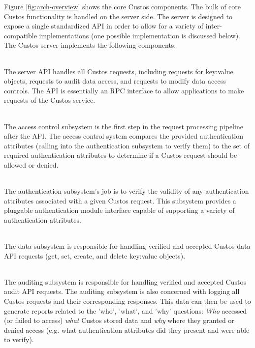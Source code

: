 Figure \ref{fig:arch-overview} shows the core Custos components.  The
bulk of core Custos functionality is handled on the server side. The
server is designed to expose a single standardized API in order to
allow for a variety of inter-compatible implementations (one possible
implementation is discussed below). The Custos server implements the
following components:

\begin{packed_desc}
\item[API] \hfill \\ The server API handles all Custos requests,
  including requests for key:value objects, requests to audit data
  access, and requests to modify data access controls. The API is
  essentially an RPC interface to allow applications to make requests
  of the Custos service.
\item[Access Control Subsystem] \hfill \\ The access control subsystem
  is the first step in the request processing pipeline after the
  API. The access control system compares the provided authentication
  attributes (calling into the authentication subsystem to verify
  them) to the set of required authentication attributes to determine
  if a Custos request should be allowed or denied.
\item[Authentication Subsystem] \hfill \\ The authentication
  subsystem's job is to verify the validity of any authentication
  attributes associated with a given Custos request. This subsystem
  provides a pluggable authentication module interface capable of
  supporting a variety of authentication attributes.
\item[Data Subsystem] \hfill \\ The data subsystem is responsible for
  handling verified and accepted Custos data API requests (get, set,
  create, and delete key:value objects).
\item[Auditing Subsystem] \hfill \\ The auditing subsystem is
  responsible for handling verified and accepted Custos audit API
  requests. The auditing subsystem is also concerned with logging all
  Custos requests and their corresponding responses. This data can
  then be used to generate reports related to the 'who', 'what', and
  'why' questions: \emph{Who} accessed (or failed to access)
  \emph{what} Custos stored data and \emph{why} where they granted or
  denied access (e.g. what authentication attributes did they present
  and were able to verify).

\end{packed_desc}
